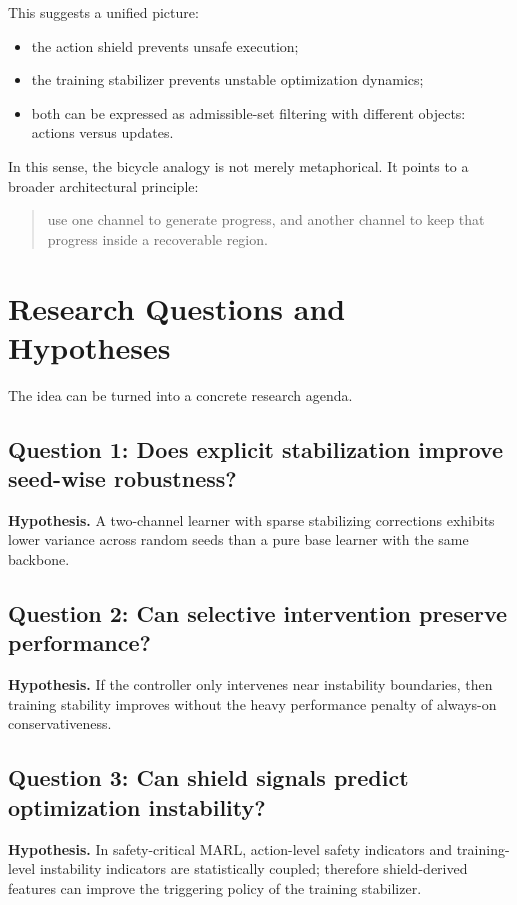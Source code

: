 \documentclass[11pt]{article}
\begin{document}
This suggests a unified picture:
\begin{itemize}[leftmargin=1.5em]
    \item the action shield prevents unsafe execution;
    \item the training stabilizer prevents unstable optimization dynamics;
    \item both can be expressed as admissible-set filtering with different objects: actions versus updates.
\end{itemize}

In this sense, the bicycle analogy is not merely metaphorical. It points to a broader architectural principle:
\begin{quote}
use one channel to generate progress, and another channel to keep that progress inside a recoverable region.
\end{quote}

\section{Research Questions and Hypotheses}

The idea can be turned into a concrete research agenda.

\subsection{Question 1: Does explicit stabilization improve seed-wise robustness?}

\textbf{Hypothesis.}
A two-channel learner with sparse stabilizing corrections exhibits lower variance across random seeds than a pure base learner with the same backbone.

\subsection{Question 2: Can selective intervention preserve performance?}

\textbf{Hypothesis.}
If the controller only intervenes near instability boundaries, then training stability improves without the heavy performance penalty of always-on conservativeness.

\subsection{Question 3: Can shield signals predict optimization instability?}

\textbf{Hypothesis.}
In safety-critical MARL, action-level safety indicators and training-level instability indicators are statistically coupled; therefore shield-derived features can improve the triggering policy of the training stabilizer.
\end{document}
